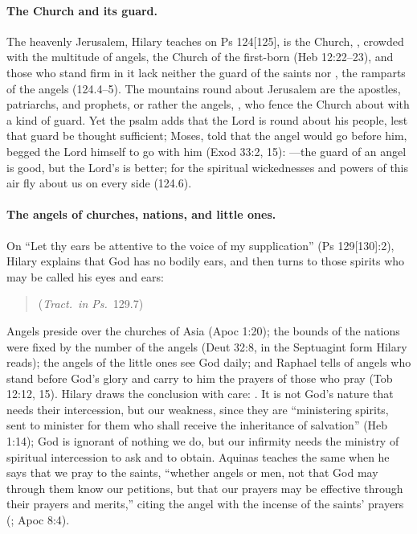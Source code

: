 \paragraph{The Church and its guard.} The heavenly Jerusalem, Hilary
teaches on Ps 124[125], is the Church, , crowded with the multitude of angels, the
Church of the first-born (Heb 12:22--23), and those who stand firm in it
lack neither the guard of the saints nor , the
ramparts of the angels (124.4--5). The mountains round about Jerusalem are
the apostles, patriarchs, and prophets, or rather the angels, , who fence the Church about with
a kind of guard. Yet the psalm adds that the Lord is round about his
people, lest that guard be thought sufficient; Moses,
told that the angel would go before him, begged the Lord himself to go
with him (Exod 33:2, 15): ---the guard of an angel is good, but the Lord's is better; for
the spiritual wickednesses and powers of this air fly about us on every
side (124.6).

\paragraph{The angels of churches, nations, and little ones.} On ``Let thy
ears be attentive to the voice of my supplication'' (Ps 129[130]:2),
Hilary explains that God has no bodily ears, and then turns to those
spirits who may be called his eyes and ears:
\begin{quote}
 (\emph{Tract.\ in Ps.}\ 129.7)
\end{quote}
\noindent Angels preside over the churches of Asia (Apoc 1:20); the
bounds of the nations were fixed by the number of the angels (Deut 32:8,
in the Septuagint form Hilary reads); the angels of the little ones see
God daily; and Raphael tells of angels who stand before God's glory and
carry to him the prayers of those who pray (Tob 12:12, 15). Hilary draws the conclusion with care:
. It is not God's nature that needs their intercession, but our
weakness, since they are ``ministering spirits, sent to minister for them
who shall receive the inheritance of salvation'' (Heb 1:14); God is
ignorant of nothing we do, but our infirmity needs the ministry of
spiritual intercession to ask and to obtain. Aquinas teaches the same when
he says that we pray to the saints, ``whether angels or men, not that God
may through them know our petitions, but that our prayers may be
effective through their prayers and merits,'' citing the angel with the
incense of the saints' prayers (; Apoc 8:4).

